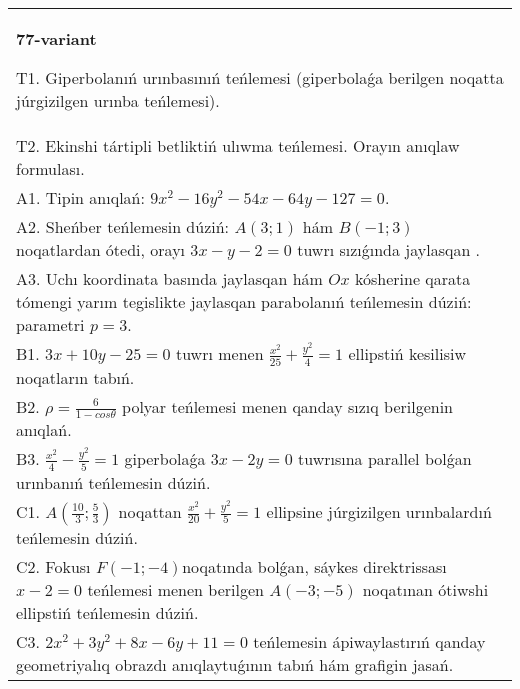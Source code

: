 \documentclass{article}
\begin{document}
\begin{tabular}{m{17cm}}
\textbf{77-variant}
\newline

T1. Giperbolanıń urınbasınıń teńlemesi (giperbolaǵa berilgen noqatta júrgizilgen urınba teńlemesi).\\

T2. Ekinshi tártipli betliktiń ulıwma teńlemesi. Orayın anıqlaw formulası.\\

A1. Tipin anıqlań: $9 x^{2}-16 y^{2}-54 x-64 y-127=0$.\\

A2. Sheńber teńlemesin dúziń: $A (3;1) $ hám $B (-1;3) $ noqatlardan ótedi, orayı $3 x-y-2=0$ tuwrı sızıǵında jaylasqan .\\

A3. Uchı koordinata basında jaylasqan hám $Ox$ kósherine qarata tómengi yarım tegislikte jaylasqan parabolanıń teńlemesin dúziń: parametri $p=3$.\\

B1. $3x + 10y - 25 = 0$ tuwrı menen $\frac{x^{2}}{25} + \frac{y^{2}}{4} = 1$ ellipstiń kesilisiw noqatların tabıń.\\

B2. $\rho = \frac{6}{1 - cos\theta}$ polyar teńlemesi menen qanday sızıq berilgenin anıqlań.  \\

B3. $\frac{x^{2}}{4} - \frac{y^{2}}{5} = 1$ giperbolaǵa $3x - 2y = 0$ tuwrısına parallel bolǵan urınbanıń teńlemesin dúziń.  \\

C1. $A(\frac{10}{3};\frac{5}{3})$ noqattan $\frac{x^{2}}{20} + \frac{y^{2}}{5} = 1$ ellipsine júrgizilgen urınbalardıń teńlemesin dúziń.  \\

C2. Fokusı $F( - 1; - 4)$noqatında bolǵan, sáykes direktrissası $x - 2 = 0$ teńlemesi menen berilgen $A( - 3; - 5)$ noqatınan ótiwshi ellipstiń teńlemesin dúziń.  \\

C3. $2x^{2} + 3y^{2} + 8x - 6y + 11 = 0$ teńlemesin ápiwaylastırıń qanday geometriyalıq obrazdı anıqlaytuǵının tabıń hám grafigin jasań.  \\

\end{tabular}
\vspace{1cm}
\end{document}
